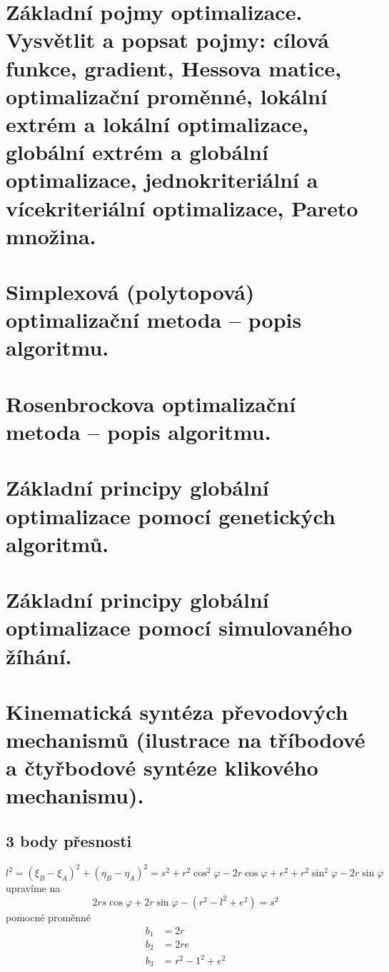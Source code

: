 \documentclass{article}
\begin{document}
	\section{Základní pojmy optimalizace. Vysvětlit a popsat pojmy: cílová funkce, gradient, Hessova matice, optimalizační proměnné, lokální extrém a lokální optimalizace, globální extrém a globální optimalizace, jednokriteriální a vícekriteriální optimalizace, Pareto množina.}

	\section{Simplexová (polytopová) optimalizační metoda – popis algoritmu.}

	\section{Rosenbrockova optimalizační metoda – popis algoritmu.}
	
	\section{Základní principy globální optimalizace pomocí genetických algoritmů.}

	\section{Základní principy globální optimalizace pomocí simulovaného žíhání.}

	\section{Kinematická syntéza převodových mechanismů (ilustrace na tříbodové a čtyřbodové syntéze klikového mechanismu).}

	\subsection*{3 body přesnosti}
	\begin{equation}
	l^{2}=\left(\xi_{B}-\xi_{A}\right)^{2}+\left(\eta_{B}-\eta_{A}\right)^{2}= s^{2}+r^{2} \cos ^{2} \varphi-2 r \cos \varphi+e^{2} + r^{2} \sin ^{2} \varphi-2 r \sin \varphi
	\end{equation}
	upravíme na
	\begin{equation}
		2 r s \cos \varphi+2 r \sin \varphi-\left(r^{2}-l^{2}+e^{2}\right)=s^{2}
	\end{equation}
	pomocné proměnné
	\begin{align}
		b_{1} &= 2 r \\
		b_{2} &= 2 r e \\
		b_{3} &= r^{2}-1^{2}+e^{2}
	\end{align}
\end{document}
